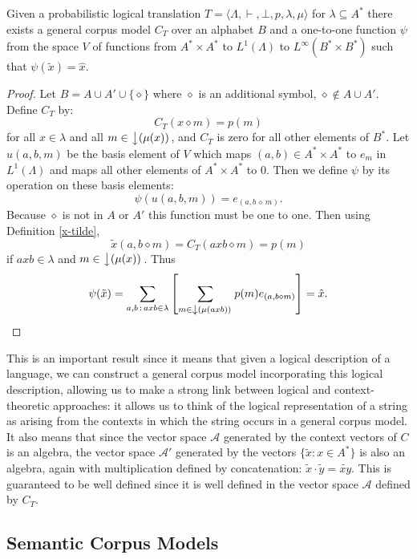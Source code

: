 \begin{prop}
Given a probabilistic logical translation $T = \langle\Lambda,\vdash, \bot, p, \lambda, \mu\rangle$ for $\lambda\subseteq A^*$  there exists a general corpus model $C_T$ over an alphabet $B$ and a one-to-one function $\psi$ from the space $V$ of functions from $A^*\times A^*$ to $L^1(\Lambda)$ to $L^\infty(B^*\times B^*)$ such that $\psi(\tilde{x}) = \hat{x}$.
\end{prop}
\begin{proof}
Let $B = A\cup A' \cup \{\diamond\}$ where $\diamond$ is an additional symbol, $\diamond \notin A \cup A'$. Define $C_T$ by:
$$C_T(x\diamond m) = p(m)$$
for all $x \in \lambda$ and all $m \in \left\downarrow(\mu(x))\right.$, and $C_T$ is zero for all other elements of $B^*$. Let $u(a,b,m)$ be the basis element of $V$ which maps $(a,b) \in A^*\times A^*$ to $e_m$ in $L^1(\Lambda)$ and maps all other elements of $A^*\times A^*$ to $0$. Then we define $\psi$ by its operation on these basis elements:
$$\psi(u(a,b,m)) = e_{(a,b\,\diamond\,m)}.$$
Because $\diamond$ is not in $A$ or $A'$ this function must be one to one. Then using Definition \ref{x-tilde},
$$\tilde{x}(a,b\diamond m) = C_T(axb\diamond m) = p(m)$$
if $axb \in \lambda$ and $m\in\left\downarrow(\mu(x))\right.$. Thus
$$\psi(\tilde{x}) = \sum_{a,b\,:\,axb \in \lambda}\left[ \sum_{m \in \left\downarrow(\mu(axb))\right.} p(m)e_{(a,b\diamond m)}\right] = \hat{x}.$$
\end{proof}

This is an important result since it means that given a logical description of a language, we can construct a general corpus model incorporating this logical description, allowing us to make a strong link between logical and context-theoretic approaches: it allows us to think of the logical representation of a string as arising from the contexts in which the string occurs in a general corpus model. It also means that since the vector space $\mathcal{A}$ generated by the context vectors of $C$ is an algebra, the vector space $\mathcal{A}'$ generated by the vectors $\{\tilde{x} : x \in A^*\}$ is also an algebra, again with multiplication defined by concatenation: $\tilde{x}\cdot \tilde{y} = \widetilde{xy}$. This is guaranteed to be well defined since it is well defined in the vector space $\mathcal{A}$ defined by $C_T$.

\subsection{Semantic Corpus Models}

